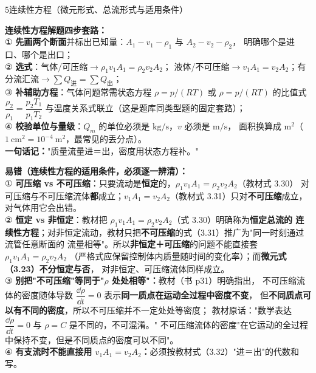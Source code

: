 \begin{kaodian}{5}{连续性方程（微元形式、总流形式与适用条件）}
\begin{banfa}
\textbf{连续性方程解题四步套路：}\\
① \textbf{先画两个断面}并标出已知量：$A_1\!-\!v_1\!-\!\rho_1$ 与 $A_2\!-\!v_2\!-\!\rho_2$，
明确哪个是进口、哪个是出口；\\
② \textbf{选式}：气体/可压缩$\to\rho_1v_1A_1=\rho_2v_2A_2$；
液体/不可压缩$\to v_1A_1=v_2A_2$；有分流汇流$\to\sum Q_{\text{进}}=\sum Q_{\text{出}}$；\\
③ \textbf{补辅助方程}：气体问题常需状态方程 $\rho=p/(RT)$ 或 $\rho=p/(RT)$ 的比值式
$\dfrac{\rho_2}{\rho_1}=\dfrac{p_2T_1}{p_1T_2}$ 与温度关系式联立（这是题库同类型题的固定套路）；\\
④ \textbf{校验单位与量级}：$Q_m$ 的单位必须是 $\mathrm{kg/s}$，$v$ 必须是 $\mathrm{m/s}$，
面积换算成 $\mathrm{m^2}$（$1\ \mathrm{cm^2}=10^{-4}\ \mathrm{m^2}$，最常见的丢分点）。\\
\textbf{一句话记：}"质量流量进＝出，密度用状态方程补。"
\end{banfa}

\begin{yicuo}
\textbf{易错（连续性方程的适用条件，必须逐一辨清）：}\\
① \textbf{可压缩 vs 不可压缩}：只要流动是\textbf{恒定}的，$\rho_1v_1A_1=\rho_2v_2A_2$（教材式 3.30）
对可压缩与不可压缩流体\textbf{都}成立；$v_1A_1=v_2A_2$（教材式 3.31）只对\textbf{不可压缩}成立，
对气体用它会出错。\\
② \textbf{恒定 vs 非恒定}：教材把 $\rho_1v_1A_1=\rho_2v_2A_2$（式 3.30）明确称为\textbf{恒定总流的
连续性方程}；对非恒定流动，教材只把\textbf{不可压缩}的式（3.31）推广为"同一时刻通过流管任意断面的
流量相等"。所以\textbf{非恒定＋可压缩}的问题不能直接套 $\rho_1v_1A_1=\rho_2v_2A_2$
（严格式应保留控制体内质量随时间的变化率）；而\textbf{微元式（3.23）不分恒定与否}，
对非恒定、可压缩流体同样成立。\\
③ \textbf{别把"不可压缩"等同于"$\rho$ 处处相等"：}教材（书 p31）明确指出，
不可压缩流体的密度随体导数 $\dfrac{\dd\rho}{\dd t}=0$ 表示\textbf{同一质点在运动全过程中密度不变}，
但\textbf{不同质点可以有不同的密度}，所以不可压缩并不一定处处等密度；
教材原话："数学表达 $\dfrac{\dd\rho}{\dd t}=0$ 与 $\rho=C$ 是不同的，不可混淆。"
不可压缩流体的密度"在它运动的全过程中保持不变，但是不同质点的密度可以不同"。\\
④ \textbf{有支流时不能直接用 $v_1A_1=v_2A_2$：}必须按教材式（3.32）"进＝出"的代数和写。
\end{yicuo}
\end{kaodian}


